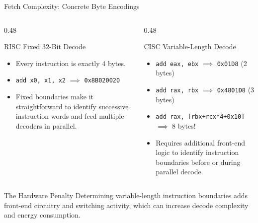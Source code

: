 \documentclass[aspectratio=169,11pt,t]{beamer}
\newcommand{\hex}[1]{\texttt{0x#1}}
\newcommand{\code}[1]{\texttt{#1}}
\begin{document}
\begin{frame}{Fetch Complexity: Concrete Byte Encodings}
\vfill
\begin{columns}[T,onlytextwidth]
\begin{column}{0.48\textwidth}
\begin{block}{RISC Fixed 32-Bit Decode}
\small
\begin{itemize}\setlength{\itemsep}{4pt}
  \item Every instruction is exactly 4 bytes.
  \item \code{add x0, x1, x2} $\implies$ \hex{8B020020}
  \item Fixed boundaries make it straightforward to identify successive instruction words and feed multiple decoders in parallel.
\end{itemize}
\end{block}
\end{column}

\begin{column}{0.48\textwidth}
\begin{block}{CISC Variable-Length Decode}
\small
\begin{itemize}\setlength{\itemsep}{4pt}
  \item \code{add eax, ebx} $\implies$ \hex{01D8} (2 bytes)
  \item \code{add rax, rbx} $\implies$ \hex{4801D8} (3 bytes)
  \item \code{add rax, [rbx+rcx*4+0x10]} $\implies$ 8 bytes!
  \item Requires additional front-end logic to identify instruction boundaries before or during parallel decode.
\end{itemize}
\end{block}
\end{column}
\end{columns}

\vfill
\begin{block}{The Hardware Penalty}
\small Determining variable-length instruction boundaries adds front-end circuitry and switching activity, which can increase decode complexity and energy consumption.
\end{block}
\vfill
\end{frame}











\end{document}
